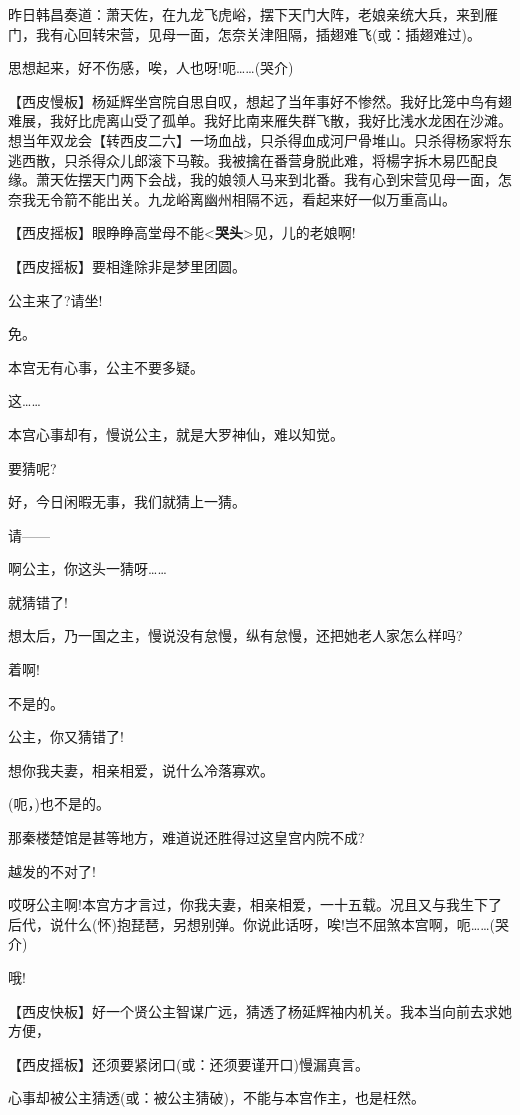 昨日韩昌奏道：萧天佐，在九龙飞虎峪，摆下天门大阵，老娘亲统大兵，来到雁门，我有心回转宋营，见母一面，怎奈关津阻隔，插翅难飞(或：插翅难过)。

思想起来，好不伤感，唉，人也呀!呃\ldots{}\ldots{}(哭介)

【西皮慢板】杨延辉坐宫院自思自叹，想起了当年事好不惨然。我好比笼中鸟有翅难展，我好比虎离山受了孤单。我好比南来雁失群飞散，我好比浅水龙困在沙滩。想当年双龙会【转西皮二六】一场血战，只杀得血成河尸骨堆山。只杀得杨家将东逃西散，只杀得众儿郎滚下马鞍。我被擒在番营身脱此难，将楊字拆木易匹配良缘。萧天佐摆天门两下会战，我的娘领人马来到北番。我有心到宋营见母一面，怎奈我无令箭不能出关。九龙峪离幽州相隔不远，看起来好一似万重高山。

【西皮摇板】眼睁睁高堂母不能\textless{}\textbf{哭头}\textgreater{}见，儿的老娘啊!

【西皮摇板】要相逢除非是梦里团圆。

公主来了?请坐!

免。

本宫无有心事，公主不要多疑。

这\ldots{}\ldots{}

本宫心事却有，慢说公主，就是大罗神仙，难以知觉。

要猜呢?

好，今日闲暇无事，我们就猜上一猜。

请------

啊公主，你这头一猜呀\ldots{}\ldots{}

就猜错了!

想太后，乃一国之主，慢说没有怠慢，纵有怠慢，还把她老人家怎么样吗?

着啊!

不是的。

公主，你又猜错了!

想你我夫妻，相亲相爱，说什么冷落寡欢。

(呃，)也不是的。

那秦楼楚馆是甚等地方，难道说还胜得过这皇宫内院不成?

越发的不对了!

哎呀公主啊!本宫方才言过，你我夫妻，相亲相爱，一十五载。况且又与我生下了后代，说什么(怀)抱琵琶，另想别弹。你说此话呀，唉!岂不屈煞本宫啊，呃\ldots{}\ldots{}(哭介)

哦!

【西皮快板】好一个贤公主智谋广远，猜透了杨延辉袖内机关。我本当向前去求她方便，

【西皮摇板】还须要紧闭口(或：还须要谨开口)慢漏真言。

心事却被公主猜透(或：被公主猜破)，不能与本宫作主，也是枉然。

